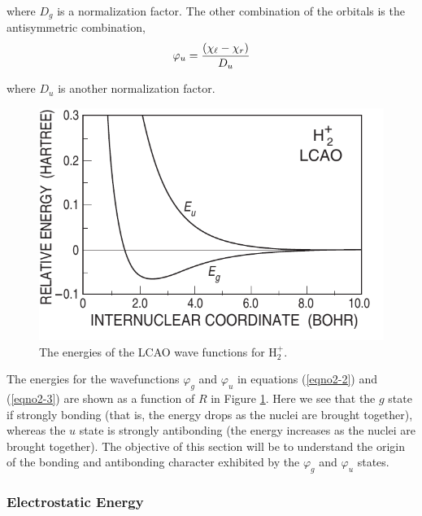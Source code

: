 \noindent
where $D_g$ is a normalization factor. The other combination of the
orbitals is the antisymmetric combination,
\begin{equation}
\varphi_u = {\left( \chi_{\ell} - \chi_r \right) \over D_u}
\label{eqno2-3}
\end{equation}

\noindent
where $D_u$ is another normalization factor.

\begin{figure}
\includegraphics[scale=0.75]{fig2-02}
\caption{The energies of the LCAO wave functions for H$_2^+$.}
\label{fig2-2}
\end{figure}

The energies for the wavefunctions $\varphi_g$ and $\varphi_u$ in
equations (\ref{eqno2-2}) and (\ref{eqno2-3}) are shown as a function
of $R$ in Figure \ref{fig2-2}. Here we see that the $g$ state if
strongly bonding (that is, the energy drops as the nuclei are brought
together), whereas the $u$ state is strongly antibonding (the energy
increases as the nuclei are brought together). The objective of this
section will be to understand the origin of the bonding and
antibonding character exhibited by the $\varphi_g$ and $\varphi_u$
states.


\subsubsection{Electrostatic Energy}

